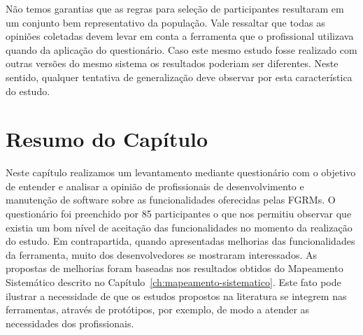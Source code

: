 Não temos garantias que as regras para seleção de participantes resultaram em
um conjunto bem representativo da população. Vale ressaltar que todas as
opiniões coletadas devem levar em conta a ferramenta que o profissional
utilizava quando da aplicação do questionário. Caso este mesmo estudo fosse
realizado com outras versões do mesmo sistema os resultados poderiam ser
diferentes. Neste sentido, qualquer tentativa de generalização deve observar
por esta característica do estudo.

\section{Resumo do Capítulo}\label{sec:resumo_do_capitulo}

Neste capítulo realizamos um levantamento mediante questionário com o objetivo
de entender e analisar a opinião de profissionais de desenvolvimento e
manutenção de software sobre as funcionalidades oferecidas pelas FGRMs. O
questionário foi preenchido por 85 participantes o que nos permitiu observar que
existia um bom nível de aceitação das funcionalidades no momento da realização
do estudo. Em contrapartida, quando apresentadas melhorias das funcionalidades
da ferramenta, muito dos desenvolvedores se mostraram interessados. As propostas
de melhorias foram baseadas nos resultados obtidos do Mapeamento Sistemático
descrito no Capítulo~\ref{ch:mapeamento-sistematico}. Este fato pode ilustrar a
necessidade de que os estudos propostos na literatura se integrem nas
ferramentas, através de protótipos, por exemplo, de modo a atender as
necessidades dos profissionais.
